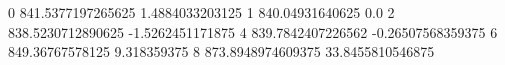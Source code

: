 0 841.5377197265625 1.4884033203125
1 840.04931640625 0.0
2 838.5230712890625 -1.5262451171875
4 839.7842407226562 -0.26507568359375
6 849.36767578125 9.318359375
8 873.8948974609375 33.8455810546875
